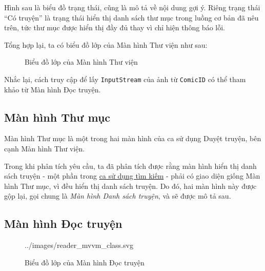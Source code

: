 \documentclass[../../../../thesis]{subfiles}
\begin{document}
Hình sau là biểu đồ trạng thái, cũng là mô tả về nội dung gợi ý. Riêng trạng
thái ``Có truyện'' là trạng thái hiển thị danh sách thư mục trong luồng cơ bản
đã nêu trên, tức thư mục được hiển thị đầy đủ thay vì chỉ hiện thông báo lỗi.

Tổng hợp lại, ta có biểu đồ lớp của Màn hình Thư viện như sau:

\begin{figure}[H]
    \centering
    
    \caption{Biểu đồ lớp của Màn hình Thư viện}
    \label{fig:library_mvvm_class}
\end{figure}

Nhắc lại, cách truy cập để lấy \texttt{InputStream} của ảnh từ \texttt{ComicID}
có thể tham khảo từ Màn hình Đọc truyện.



\subsection{Màn hình Thư mục}\label{sec:folder-design}

Màn hình Thư mục là một trong hai màn hình của ca sử dụng Duyệt truyện, bên cạnh
Màn hình Thư viện.

Trong khi phân tích yêu cầu, ta đã phân tích được rằng màn hình hiển thị danh
sách truyện - một phần trong \hyperref[sec:search-comic]{ca sử dụng tìm kiếm} -
phải có giao diện giống Màn hình Thư mục, vì đều hiển thị danh sách truyện. Do
đó, hai màn hình này được gộp lại, gọi chung là \emph{Màn hình Danh sách
truyện}, và sẽ được mô tả sau.



\subsection{Màn hình Đọc truyện}\label{sec:reader-design}

\begin{wrapfigure}[9]{r}{11.5cm}
    \centering
    
        {../images/reader_mvvm_class.svg}
    \caption{Biểu đồ lớp của Màn hình Đọc truyện}
    \label{fig:reader_mvvm_class}
\end{wrapfigure}
\end{document}
